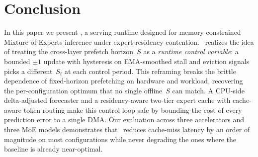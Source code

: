 \section{Conclusion}
\label{sec:conclusion}

In this paper we present \systemname, a serving runtime designed for
memory-constrained Mixture-of-Experts inference under
expert-residency contention.
\systemname\ realizes the idea of treating the cross-layer prefetch
horizon~$S$ as a \emph{runtime control variable}: a bounded $\pm 1$
update with hysteresis on EMA-smoothed stall and eviction signals
picks a different~$S_t$ at each control period.
This reframing breaks the brittle dependence of fixed-horizon
prefetching on hardware and workload, recovering the per-configuration
optimum that no single offline~$S$ can match.
A CPU-side delta-adjusted forecaster and a residency-aware two-tier
expert cache with cache-aware token routing make this control loop
safe by bounding the cost of every prediction error to a single DMA.
Our evaluation across three accelerators and three MoE models
demonstrates that \systemname\ reduces cache-miss latency by an
order of magnitude on most configurations while never degrading the
ones where the baseline is already near-optimal.